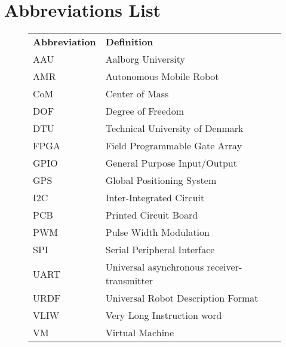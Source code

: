 \newpage
\section*{Abbreviations List}

\begin{figure}[H]
   \begin{center}
       \begin{tabular}{ ll }
            \textbf{Abbreviation}   &       \textbf{Definition}  
            \\
            AAU                     &       Aalborg University 
            \\
            AMR                     &       Autonomous Mobile Robot    
             \\
            CoM                     &       Center of Mass
            \\
            DOF                     &       Degree of Freedom
            \\
            DTU                     &       Technical University of Denmark
            \\
            FPGA                    &       Field Programmable Gate Array
            \\
            GPIO                    &       General Purpose Input/Output
            \\
            GPS                     &       Global Positioning System 
            \\
            I2C                     &       Inter-Integrated Circuit
            \\
            PCB                    &       Printed Circuit Board
            \\
            PWM                     &       Pulse Width Modulation
            \\
            SPI                     &       Serial Peripheral Interface
            \\
            UART                    &       Universal asynchronous receiver-transmitter
            \\
            URDF                    &       Universal Robot Description Format
            \\
            VLIW                    &       Very Long Instruction word
            \\
            VM                      &       Virtual Machine 
        \end{tabular}
   \end{center}
\end{figure}
